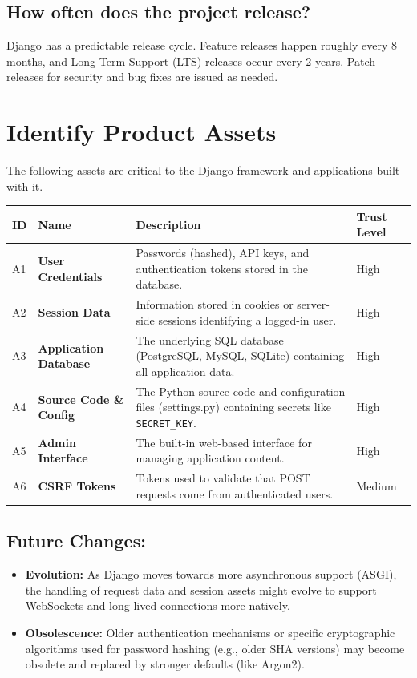 \documentclass[10pt,a4paper]{article}
\begin{document}
\subsection*{How often does the project release?}
Django has a predictable release cycle. Feature releases happen roughly every 8 months, and Long Term Support (LTS) releases occur every 2 years. Patch releases for security and bug fixes are issued as needed.

\section*{Identify Product Assets}

The following assets are critical to the Django framework and applications built with it.

\begin{longtable}{|l|p{4cm}|p{6cm}|l|}
\hline
\textbf{ID} & \textbf{Name} & \textbf{Description} & \textbf{Trust Level} \\
\hline
\endhead
A1 & \textbf{User Credentials} & Passwords (hashed), API keys, and authentication tokens stored in the database. & High \\
\hline
A2 & \textbf{Session Data} & Information stored in cookies or server-side sessions identifying a logged-in user. & High \\
\hline
A3 & \textbf{Application Database} & The underlying SQL database (PostgreSQL, MySQL, SQLite) containing all application data. & High \\
\hline
A4 & \textbf{Source Code \& Config} & The Python source code and configuration files (settings.py) containing secrets like \texttt{SECRET\_KEY}. & High \\
\hline
A5 & \textbf{Admin Interface} & The built-in web-based interface for managing application content. & High \\
\hline
A6 & \textbf{CSRF Tokens} & Tokens used to validate that POST requests come from authenticated users. & Medium \\
\hline
\end{longtable}

\subsection*{Future Changes:}
\begin{itemize}
    \item \textbf{Evolution:} As Django moves towards more asynchronous support (ASGI), the handling of request data and session assets might evolve to support WebSockets and long-lived connections more natively.
    \item \textbf{Obsolescence:} Older authentication mechanisms or specific cryptographic algorithms used for password hashing (e.g., older SHA versions) may become obsolete and replaced by stronger defaults (like Argon2).
\end{itemize}
\end{document}
